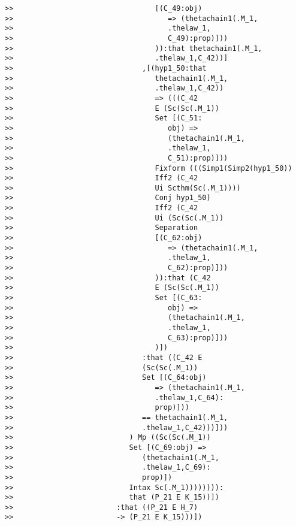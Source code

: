 \documentclass[12pt]{article}
\begin{document}
\begin{verbatim}
>>                                 [(C_49:obj)
>>                                    => (thetachain1(.M_1,
>>                                    .thelaw_1,
>>                                    C_49):prop)]))
>>                                 )):that thetachain1(.M_1,
>>                                 .thelaw_1,C_42))]
>>                              ,[(hyp1_50:that
>>                                 thetachain1(.M_1,
>>                                 .thelaw_1,C_42))
>>                                 => (((C_42
>>                                 E (Sc(Sc(.M_1))
>>                                 Set [(C_51:
>>                                    obj) =>
>>                                    (thetachain1(.M_1,
>>                                    .thelaw_1,
>>                                    C_51):prop)]))
>>                                 Fixform (((Simp1(Simp2(hyp1_50))
>>                                 Iff2 (C_42
>>                                 Ui Scthm(Sc(.M_1))))
>>                                 Conj hyp1_50)
>>                                 Iff2 (C_42
>>                                 Ui (Sc(Sc(.M_1))
>>                                 Separation
>>                                 [(C_62:obj)
>>                                    => (thetachain1(.M_1,
>>                                    .thelaw_1,
>>                                    C_62):prop)]))
>>                                 )):that (C_42
>>                                 E (Sc(Sc(.M_1))
>>                                 Set [(C_63:
>>                                    obj) =>
>>                                    (thetachain1(.M_1,
>>                                    .thelaw_1,
>>                                    C_63):prop)]))
>>                                 )])
>>                              :that ((C_42 E
>>                              (Sc(Sc(.M_1))
>>                              Set [(C_64:obj)
>>                                 => (thetachain1(.M_1,
>>                                 .thelaw_1,C_64):
>>                                 prop)]))
>>                              == thetachain1(.M_1,
>>                              .thelaw_1,C_42)))]))
>>                           ) Mp ((Sc(Sc(.M_1))
>>                           Set [(C_69:obj) =>
>>                              (thetachain1(.M_1,
>>                              .thelaw_1,C_69):
>>                              prop)])
>>                           Intax Sc(.M_1)))))))):
>>                           that (P_21 E K_15))])
>>                        :that ((P_21 E H_7)
>>                        -> (P_21 E K_15)))])

\end{verbatim}
\end{document}
